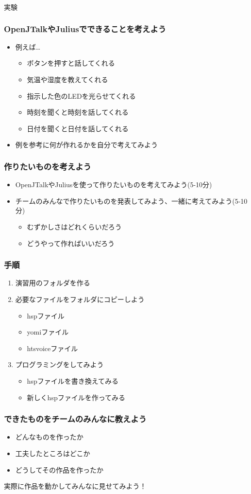 \documentclass[14pt]{beamer}
\begin{document}
\begin{frame}
  \centering
  実験
\end{frame}

\begin{frame}
  \frametitle{OpenJTalkやJuliusでできることを考えよう}
  \begin{itemize}
    \item 例えば…
    \begin{itemize}
      \item ボタンを押すと話してくれる
      \item 気温や湿度を教えてくれる
      \item 指示した色のLEDを光らせてくれる
      \item 時刻を聞くと時刻を話してくれる
      \item 日付を聞くと日付を話してくれる
    \end{itemize}
    \item 例を参考に何が作れるかを自分で考えてみよう
  \end{itemize}
\end{frame}

\begin{frame}
  \frametitle{作りたいものを考えよう}
  \begin{itemize}
    \item OpenJTalkやJuliusを使って作りたいものを考えてみよう(5-10分)
    \item チームのみんなで作りたいものを発表してみよう、一緒に考えてみよう(5-10分)
    \begin{itemize}
      \item むずかしさはどれくらいだろう
      \item どうやって作ればいいだろう
    \end{itemize}
  \end{itemize}
\end{frame}
\begin{frame}
  \frametitle{手順}
  \begin{enumerate}
    \item 演習用のフォルダを作る
    \item 必要なファイルをフォルダにコピーしよう
    \begin{itemize}
      \item hspファイル
      \item yomiファイル
      \item htsvoiceファイル
    \end{itemize}
    \item プログラミングをしてみよう
    \begin{itemize}
      \item hspファイルを書き換えてみる
      \item 新しくhspファイルを作ってみる
    \end{itemize}
  \end{enumerate}
\end{frame}

\begin{frame}
  \frametitle{できたものをチームのみんなに教えよう}
  \begin{itemize}
    \item どんなものを作ったか
    \item 工夫したところはどこか
    \item どうしてその作品を作ったか
  \end{itemize}
  実際に作品を動かしてみんなに見せてみよう！
\end{frame}
\end{document}
